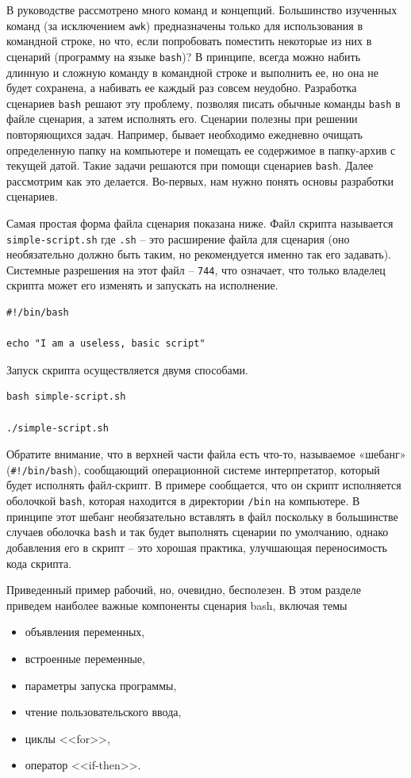 \documentclass[a4paper,12pt,final,openany]{extbook}
\providecommand{\tightlist}{%
  \setlength{\itemsep}{0pt}\setlength{\parskip}{0pt}}
\begin{document}
В руководстве рассмотрено много команд и концепций. Большинство
изученных команд (за исключением \texttt{awk}) предназначены только для
использования в командной строке, но что, если попробовать поместить
некоторые из них в сценарий (программу на языке \texttt{bash})? В принципе,
всегда можно набить длинную и сложную команду в командной строке и выполнить ее,
но она не будет сохранена, а набивать ее каждый раз совсем неудобно.
Разработка сценариев \texttt{bash} решают эту проблему, позволяя писать обычные
команды \texttt{bash} в файле сценария, а затем исполнять его. Сценарии полезны
при решении повторяющихся задач. Например, бывает необходимо
ежедневно очищать определенную папку на компьютере и помещать ее
содержимое в папку-архив с текущей датой. Такие задачи решаются при
помощи сценариев \texttt{bash}. Далее рассмотрим как это делается.
Во-первых, нам нужно понять основы разработки сценариев.

Самая простая форма файла сценария показана ниже. Файл скрипта
называется \texttt{simple-script.sh} где \texttt{.sh} -- это расширение
файла для сценария (оно необязательно должно быть таким, но
рекомендуется именно так его задавать). Системные разрешения на этот файл --
\texttt{744}, что означает, что только владелец скрипта может его
изменять и запускать на исполнение.
\begin{verbatim}
#!/bin/bash

echo "I am a useless, basic script"
\end{verbatim}

Запуск скрипта осуществляется двумя способами.
\begin{verbatim}
bash simple-script.sh

./simple-script.sh
\end{verbatim}

Обратите внимание, что в верхней части файла есть что-то, называемое
«шебанг» (\texttt{\#!/bin/bash}), сообщающий операционной системе
интерпретатор, который будет исполнять файл-скрипт. В примере
сообщается, что он скрипт исполняется оболочкой \texttt{bash}, которая находится
в директории \texttt{/bin} на компьютере. В  принципе этот шебанг необязательно вставлять в файл поскольку в большинстве случаев оболочка \texttt{bash} и так будет
выполнять сценарии по умолчанию, однако добавления его в
скрипт -- это хорошая практика, улучшающая переносимость кода скрипта.

Приведенный пример рабочий, но, очевидно, бесполезен. В этом разделе
приведем наиболее важные компоненты сценария bash, включая темы
\begin{itemize}
\tightlist
\item
  объявления переменных,
\item
  встроенные переменные,
\item
  параметры запуска программы,
\item
  чтение пользовательского ввода,
\item
  циклы <<for>>,
\item
  оператор <<if-then>>.
\end{itemize}
\end{document}
